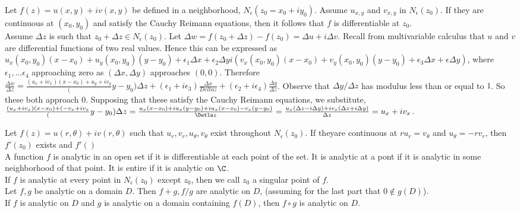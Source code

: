 \documentclass{article}
\begin{document}
 Let $f(z) = u(x,y) + iv(x,y)$ be defined in a neighborhood, $N_\epsilon(z_0 = x_0 + iy_0)$. Assume $u_{x,y}$ and $v_{x,y}$ in $N_\epsilon(z_0).$ If they are continuous at $(x_0,y_0)$ and satisfy the Cauchy Reimann equations, then it follows that $f$ is differentiable at $z_0$.\\
 Assume $\Delta z$ is such that $z_0 +\Delta z \in N_\epsilon(z_0).$ Let $\Delta w = f(z_0 + \Delta z) - f(z_0) =  \Delta u + i \Delta v.$  Recall from multivariable calculus that $u$ and $v$ are differential functions of two real values. Hence this can be expressed as $u_x(x_0,y_0)(x- x_0) + u_y(x_0,y_0)(y- y_0) + \epsilon_1 \Delta x + \epsilon_2 \Delta y
 i(v_x(x_0,y_0)(x- x_0) + v_y(x_0,y_0)(y- y_0) + \epsilon_3 \Delta x + \epsilon \Delta y)$, where $\epsilon_1,\dots\epsilon_4$ approaching zero as $(\Delta x, \Delta y)$ approaches $(0,0)$. 
 Therefore $\frac{\Delta w}{\Delta z} = \frac{(u_x+iv_x)(x-x_0) + u_y+iv_y}(y- y_0){\Delta z} + (\epsilon_1 + i\epsilon_3)\frac{\Delta x}{Delta z} + (\epsilon_2 + i\epsilon_4)\frac{\Delta y}{\Delta z}$. Observe that $\Delta y/\Delta z$ has modulus less than or equal to $1$. So these both approach $0$. Supposing that these satisfy the Cauchy Reimann equations, we substitute, $\frac{(u_x+iv_x)(x-x_0) + (-v_x+iv_x}(y- y_0){\Delta z} = \frac{u_x(x-x_0) + iu_x(y-y_0) + iu_x(x-x_0) - v_x(y-y_0)}{\Detla z} = \frac{u_x(\Delta z- i\Delta y) + iv_x(\Delta z + i\Delta y)}{\Delta z} = u_x + iv_x$.
 
 Let $f(z) = u(r,\theta)+ iv(r,\theta)$ such that $u_r, v_r, u_\theta, v_\theta$ exist throughout $N_\epsilon(z_0)$. If theyare continuous at $r u_r = v_\theta $ and $u_\theta = -rv_r$, then $f'(z_0)$ exists and $f'()$\\

 A function $f$ is analytic in an open set if it is differentiable at each point of the set. It is analytic at a pont if it is analytic in some neighborhood of that point. It is entire if it is analytic on $\C$.\\

 If $f$ is analytic at every point in $N_\epsilon(z_0)$ except $z_0$, then we call $z_0$ a singular point of $f$.\\

 Let $f,g$ be analytic on a domain $D$. Then $f+g,f/g$ are analytic on $D$, (assuming for the last part that $0\not \in g(D)$).\\

 If $f$ is analytic on $D$ and $g$ is analytic on a domain containing $f(D)$, then $f\circ g$ is analytic on $D$. \\
\end{document}
